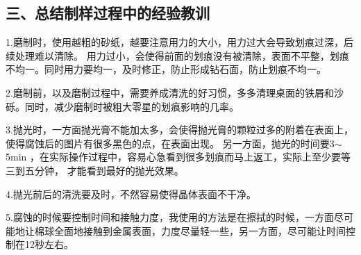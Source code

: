 \documentclass[a4paper,utf8]{article}
\begin{document}
\subsection*{三、总结制样过程中的经验教训}

1.磨制时，使用越粗的砂纸，越要注意用力的大小，用力过大会导致划痕过深，后续处理难以清除。
用力过小，会使得前面的划痕没有被清除，表面不平整，划痕不均一。同时用力要均一，及时修正，防止形成钻石面，防止划痕不均一。

2.磨制前，以及磨制过程中，需要养成清洗的好习惯，多多清理桌面的铁屑和沙砾。同时，减少磨制时被粗大零星的划痕影响的几率。

3.抛光时，一方面抛光膏不能加太多，会使得抛光膏的颗粒过多的附着在表面上，使得腐蚀后的图片有很多黑色的点，在表面出现。
另一方面，抛光的时间要3$\sim $5min ，在实际操作过程中，容易心急看到很多划痕而马上返工，实际上至少要等三到五分钟，
才能看到最好的抛光效果。

4.抛光前后的清洗要及时，不然容易使得晶体表面不干净。

5.腐蚀的时候要控制时间和接触力度，我使用的方法是在擦拭的时候，一方面尽可能地让棉球全面地接触到金属表面，力度尽量轻一些，另一方面，尽可能让时间控制在12秒左右。
\end{document}
